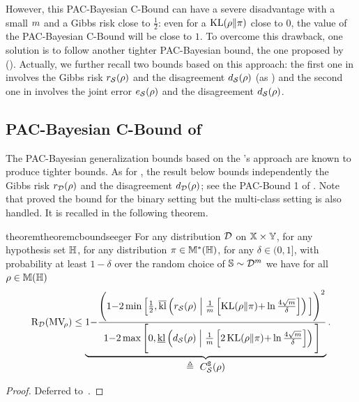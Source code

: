 However, this PAC-Bayesian C-Bound can have a severe disadvantage with a small $m$ and a Gibbs risk close to $\tfrac{1}{2}$: even for a $\operatorname{KL}(\rho\|\pi)$ close to $0$, the value of the PAC-Bayesian C-Bound will be close to $1$.
To overcome this drawback, one solution is to follow another tighter PAC-Bayesian bound, the one proposed by \citet{Seeger2002} ().
%
Actually, we further recall two bounds based on this approach: the first one in  involves the Gibbs risk $r_{\mathcal{S}}(\rho)$ and the disagreement $d_{\mathcal{S}}(\rho)$ (as ) and the second one in  involves the joint error $e_{\mathcal{S}}(\rho)$ and the disagreement $d_{\mathcal{S}}(\rho)$.  

\subsection{PAC-Bayesian C-Bound of \protect\citeauthor{GermainLacasseLavioletteMarchandRoy2015}}

The PAC-Bayesian generalization bounds based on the \citeauthor{Seeger2002}'s approach are known to produce tighter bounds.
As for , the result below bounds independently the Gibbs risk $r_{\mathcal{D}}(\rho)$ and the disagreement $d_{\mathcal{D}}(\rho)$; see the PAC-Bound 1 of \citet{GermainLacasseLavioletteMarchandRoy2015}.
Note that \citet{GermainLacasseLavioletteMarchandRoy2015} proved the bound for the binary setting but the multi-class setting is also handled.
It is recalled in the following theorem.

\begin{restatable}{theorem}{theoremcboundseeger}\label{chap:mv:theorem:cbound-seeger}
For any distribution $\mathcal{D}$ on $\mathbb{X}\times\mathbb{Y}$, for any hypothesis set $\mathbb{H}$, for any distribution $\pi\in\mathbb{M}^{*}(\mathbb{H})$, for any $\delta\in(0,1]$, with probability at least $1-\delta$ over the random choice of $\mathbb{S}\sim\mathcal{D}^m$ we have for all $\rho\in\mathbb{M}(\mathbb{H})$
\begin{align}
\Risk_{\D}(\MVQ) \le \underbrace{1{-}\frac{\Bigg(1{-}2\min\Big[\frac{1}{2},  \klmax \LP r_{\dS}(\Q) \;\middle|\; \frac{1}{\m}\LB \KL(\Q\|\P){+}\ln\tfrac{4\sqrt{\m}}{\delta}\RB\RP\Big]\Bigg)^2}{1{-}2\max\Bigg[ 0,
\klmin\LP d_{\dS}(\Q) \;\middle|\; \frac{1}{\m}\LB 2\KL(\Q\|\P){+}\ln\tfrac{4\sqrt{\m}}{\delta}\RB\RP\Bigg]}}_{\displaystyle\defeq\ \SCBound}.\label{chap:mv:eq:cbound-seeger}
\end{align}
\end{restatable}
\begin{noaddcontents}\begin{proof}
Deferred to~.
\end{proof}\end{noaddcontents}

